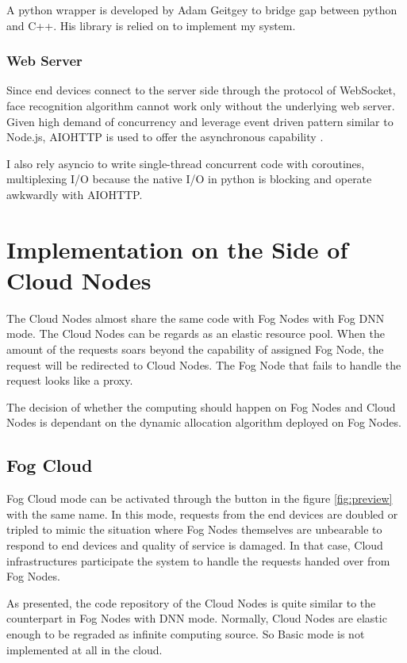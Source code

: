 A python wrapper is developed by Adam Geitgey to bridge gap between python and C++\cite{python-facerecognition}. His library is relied on to implement my system.

\subsubsection{Web Server}
Since end devices connect to the server side through the protocol of WebSocket, face recognition algorithm cannot work only without the underlying web server. Given high demand of concurrency and leverage event driven pattern similar to Node.js, AIOHTTP is used to offer the asynchronous capability \cite{python-aiohttp}.

I also rely asyncio to write single-thread concurrent code with coroutines, multiplexing I/O because the native I/O in python is blocking and operate awkwardly with AIOHTTP. 

\section{Implementation on the Side of Cloud Nodes}
The Cloud Nodes almost share the same code with Fog Nodes with Fog DNN mode. The Cloud Nodes can be regards as an elastic resource pool. When the amount of the requests soars beyond the capability of assigned Fog Node, the request will be redirected to Cloud Nodes. The Fog Node that fails to handle the request looks like a proxy.

The decision of whether the computing should happen on Fog Nodes and Cloud Nodes is dependant on the dynamic allocation algorithm deployed on Fog Nodes.

\subsection{Fog Cloud}
Fog Cloud mode can be activated through the button in the figure \ref{fig:preview} with the same name. In this mode, requests from the end devices are doubled or tripled to mimic the situation where Fog Nodes themselves are unbearable to respond to end devices and quality of service is damaged. In that case, Cloud infrastructures participate the system to handle the requests handed over from Fog Nodes.

As presented, the code repository of the Cloud Nodes is quite similar to the counterpart in Fog Nodes with DNN mode. Normally, Cloud Nodes are elastic enough to be regraded as infinite computing source. So Basic mode is not implemented at all in the cloud.

